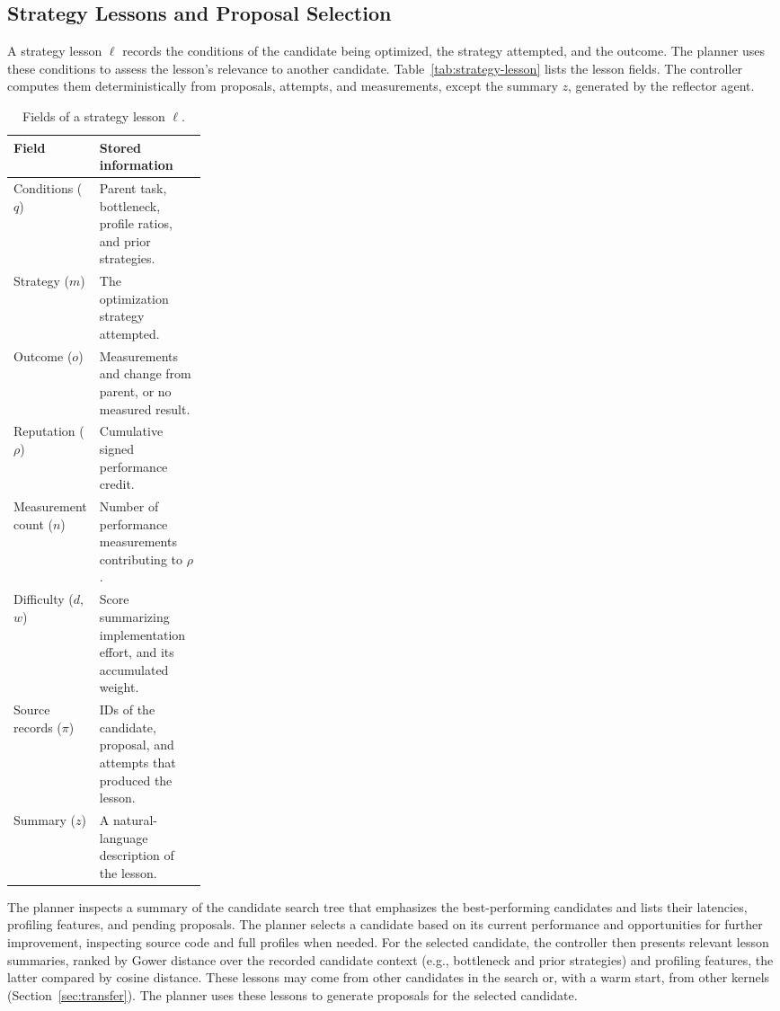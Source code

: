\documentclass[acmsmall,screen,review,anonymous,nonacm]{acmart}
\begin{document}
\subsection{Strategy Lessons and Proposal Selection}
\label{sec:lesson-ranking}
\label{sec:proposal-ranking}

A strategy lesson $\ell$ records the conditions of the candidate being optimized,
the strategy attempted, and the outcome. The planner uses these conditions to
assess the lesson's relevance to another candidate. Table~\ref{tab:strategy-lesson}
lists the lesson fields. The controller computes them deterministically from
proposals, attempts, and measurements, except the summary $z$, generated by
the reflector agent.

\begin{table}[htbp]
  \caption{Fields of a strategy lesson $\ell$.}
  \label{tab:strategy-lesson}
  \label{eq:lesson}
  \small
  \renewcommand{\arraystretch}{1.0}
  \begin{tabular}{@{}p{0.25\linewidth}p{}@{}}
    \toprule
    Field & Stored information \\
    \midrule
    Conditions ($q$) & Parent task, bottleneck, profile ratios, and prior strategies. \\
    Strategy ($m$) & The optimization strategy attempted. \\
    Outcome ($o$) & Measurements and change from parent, or no measured result. \\
    Reputation ($\rho$) & Cumulative signed performance credit. \\
    Measurement count ($n$) & Number of performance measurements contributing to $\rho$. \\
    Difficulty ($d$, $w$) & Score summarizing implementation effort, and its accumulated weight. \\
    Source records ($\pi$) & IDs of the candidate, proposal, and attempts that produced the lesson. \\
    Summary ($z$) & A natural-language description of the lesson. \\
    \bottomrule
  \end{tabular}
\end{table}


The planner inspects a summary of the candidate search tree that emphasizes
the best-performing candidates and lists their latencies, profiling features,
and pending proposals. The planner selects a candidate
based on its current performance and opportunities for further improvement,
inspecting source code and full profiles when needed. For the selected candidate,
the controller then presents relevant lesson summaries, ranked by
Gower distance over the recorded candidate context (e.g., bottleneck and prior strategies) and profiling features, the latter compared by
cosine distance. These lessons may come from other candidates in the search or,
with a warm start, from other kernels (Section~\ref{sec:transfer}). The planner
uses these lessons to generate proposals for the selected candidate.
\end{document}
